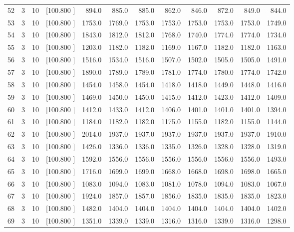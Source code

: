 \documentclass[12pt,a4paper]{article}
\begin{document}
\begin{center}
{\begin{tabular}{r r r r r r r r r r r r}
  52&  3& 10&[100.800   ]&   894.0&   885.0&   885.0&   862.0&   846.0&   872.0&   849.0&   844.0\\[-0.02in]
  53&  3& 10&[100.800   ]&  1753.0&  1769.0&  1753.0&  1753.0&  1753.0&  1753.0&  1753.0&  1749.0\\[-0.02in]
  54&  3& 10&[100.800   ]&  1843.0&  1812.0&  1812.0&  1768.0&  1740.0&  1774.0&  1774.0&  1734.0\\[-0.02in]
  55&  3& 10&[100.800   ]&  1203.0&  1182.0&  1182.0&  1169.0&  1167.0&  1182.0&  1182.0&  1163.0\\[-0.02in]
  56&  3& 10&[100.800   ]&  1516.0&  1534.0&  1516.0&  1507.0&  1502.0&  1505.0&  1505.0&  1491.0\\[-0.02in]
  57&  3& 10&[100.800   ]&  1890.0&  1789.0&  1789.0&  1781.0&  1774.0&  1780.0&  1774.0&  1742.0\\[-0.02in]
  58&  3& 10&[100.800   ]&  1454.0&  1458.0&  1454.0&  1418.0&  1418.0&  1449.0&  1448.0&  1416.0\\[-0.02in]
  59&  3& 10&[100.800   ]&  1469.0&  1450.0&  1450.0&  1415.0&  1412.0&  1423.0&  1412.0&  1409.0\\[-0.02in]
  60&  3& 10&[100.800   ]&  1412.0&  1433.0&  1412.0&  1406.0&  1401.0&  1401.0&  1401.0&  1394.0\\[-0.02in]
  61&  3& 10&[100.800   ]&  1184.0&  1182.0&  1182.0&  1175.0&  1155.0&  1182.0&  1155.0&  1144.0\\[-0.02in]
  62&  3& 10&[100.800   ]&  2014.0&  1937.0&  1937.0&  1937.0&  1937.0&  1937.0&  1937.0&  1910.0\\[-0.02in]
  63&  3& 10&[100.800   ]&  1426.0&  1336.0&  1336.0&  1335.0&  1326.0&  1328.0&  1328.0&  1319.0\\[-0.02in]
  64&  3& 10&[100.800   ]&  1592.0&  1556.0&  1556.0&  1556.0&  1556.0&  1556.0&  1556.0&  1493.0\\[-0.02in]
  65&  3& 10&[100.800   ]&  1716.0&  1699.0&  1699.0&  1668.0&  1668.0&  1698.0&  1698.0&  1665.0\\[-0.02in]
  66&  3& 10&[100.800   ]&  1083.0&  1094.0&  1083.0&  1081.0&  1078.0&  1094.0&  1083.0&  1067.0\\[-0.02in]
  67&  3& 10&[100.800   ]&  1924.0&  1857.0&  1857.0&  1856.0&  1835.0&  1835.0&  1835.0&  1823.0\\[-0.02in]
  68&  3& 10&[100.800   ]&  1482.0&  1404.0&  1404.0&  1404.0&  1404.0&  1404.0&  1404.0&  1402.0\\[-0.02in]
  69&  3& 10&[100.800   ]&  1351.0&  1339.0&  1339.0&  1316.0&  1316.0&  1339.0&  1316.0&  1298.0\\[-0.02in]

\end{tabular}}
\end{center}
\end{document}
